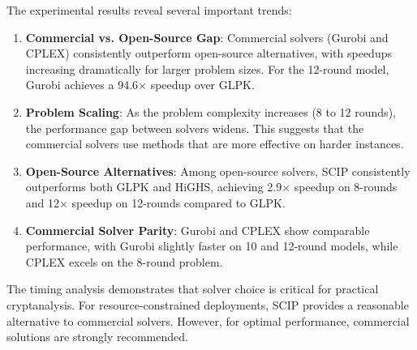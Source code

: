 The experimental results reveal several important trends:

\begin{enumerate}
    \item \textbf{Commercial vs. Open-Source Gap}: Commercial solvers (Gurobi and CPLEX) consistently outperform open-source alternatives, with speedups increasing dramatically for larger problem sizes. For the 12-round model, Gurobi achieves a 94.6$\times$ speedup over GLPK.
    
    \item \textbf{Problem Scaling}: As the problem complexity increases (8 to 12 rounds), the performance gap between solvers widens. This suggests that the commercial solvers use methods that are more effective on harder instances.
    
    \item \textbf{Open-Source Alternatives}: Among open-source solvers, SCIP consistently outperforms both GLPK and HiGHS, achieving 2.9$\times$ speedup on 8-rounds and 12$\times$ speedup on 12-rounds compared to GLPK.
    
    \item \textbf{Commercial Solver Parity}: Gurobi and CPLEX show comparable performance, with Gurobi slightly faster on 10 and 12-round models, while CPLEX excels on the 8-round problem.
\end{enumerate}

The timing analysis demonstrates that solver choice is critical for practical cryptanalysis. For resource-constrained deployments, SCIP provides a reasonable alternative to commercial solvers. However, for optimal performance, commercial solutions are strongly recommended.
